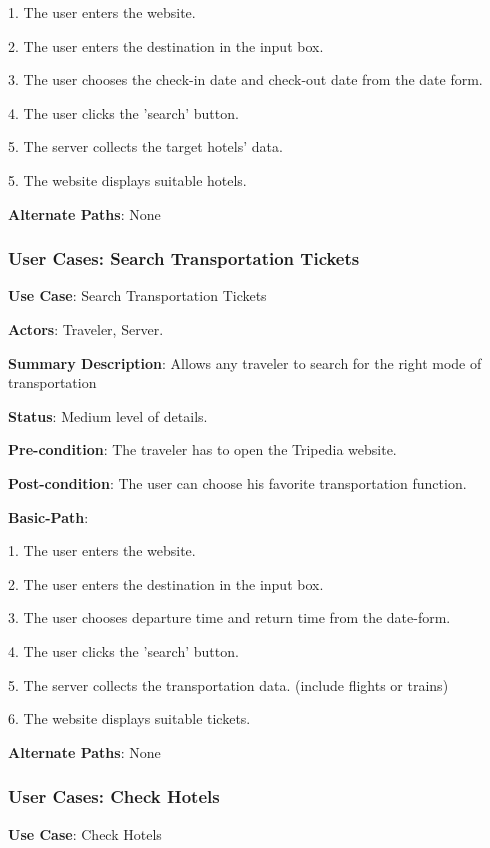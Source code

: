 \documentclass[conference]{IEEEtran}
\begin{document}
1. The user enters the website.

2. The user enters the destination in the input box.

3. The user chooses the check-in date and check-out date from the date form.

4. The user clicks the 'search' button.

5. The server collects the target hotels' data.

5. The website displays suitable hotels.

\textbf{Alternate Paths}: None

\subsubsection{User Cases: Search Transportation Tickets}

\textbf{ }

\textbf{Use Case}: Search Transportation Tickets

\textbf{Actors}: Traveler, Server.

\textbf{Summary Description}: Allows any traveler to search for the right mode of transportation

\textbf{Status}: Medium level of details.

\textbf{Pre-condition}: The traveler has to open the Tripedia website.

\textbf{Post-condition}: The user can choose his favorite transportation function.

\textbf{Basic-Path}:

1. The user enters the website.

2. The user enters the destination in the input box.

3. The user chooses departure time and return time from the date-form.

4. The user clicks the 'search' button.

5. The server collects the transportation data. (include flights or trains)

6. The website displays suitable tickets. 


\textbf{Alternate Paths}: None

\subsubsection{User Cases: Check Hotels}

\textbf{ }

\textbf{Use Case}: Check Hotels
\end{document}
